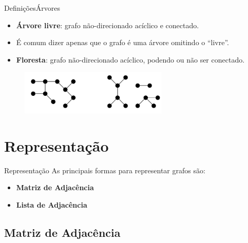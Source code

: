 \documentclass[aspectratio=169]{beamer}
\begin{document}
\begin{frame}{Definições}{Árvores}
\begin{itemize}
\item {\bf Árvore livre}: grafo não-direcionado acíclico e conectado.
\item É comum dizer apenas que o grafo é uma árvore omitindo o ``livre''.
\item {\bf Floresta}: grafo não-direcionado acíclico, podendo ou não ser
conectado.
\end{itemize}
\begin{figure}[!h]
  \centering
  \includegraphics[width=200pt]{imagens/exemplo_arvores.png}
  \label{fig_exemplo_arvores}
\end{figure}
\end{frame}

\section{Representação}

\begin{frame}{Representação}
As principais formas para representar grafos são:
\begin{itemize}
\item {\bf Matriz de Adjacência}
\item {\bf Lista de Adjacência}
\end{itemize}
\end{frame}

\subsection{Matriz de Adjacência}
\end{document}
